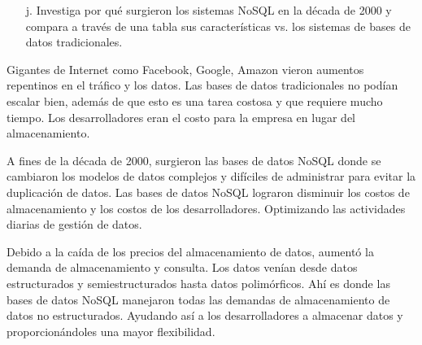 \documentclass{article}
\begin{document}
\begin{enumerate}
\begin{itemize}
    \item[j.]Investiga por qué surgieron los sistemas NoSQL en la década de 2000 y compara a través de una tabla sus características vs. los sistemas de bases de datos tradicionales.
    \end{itemize}
    Gigantes de Internet como Facebook, Google, Amazon vieron aumentos repentinos en el tráfico y los datos. Las bases de datos tradicionales no podían escalar bien, además de que esto es una tarea costosa y que requiere mucho tiempo. Los desarrolladores eran el costo para la empresa en lugar del almacenamiento. 
 
   A fines de la década de 2000, surgieron las bases de datos NoSQL donde se cambiaron los modelos de datos complejos y difíciles de administrar para evitar la duplicación de datos. 
   Las bases de datos NoSQL lograron disminuir los costos de almacenamiento y  los costos de los desarrolladores. Optimizando las actividades diarias de gestión de datos.

   Debido a la caída de los precios del almacenamiento de datos, aumentó la demanda de almacenamiento y consulta. Los datos venían desde datos estructurados y semiestructurados hasta datos polimórficos. Ahí es donde las bases de datos NoSQL manejaron todas las demandas de almacenamiento de datos no estructurados. Ayudando así a los desarrolladores a almacenar datos y proporcionándoles una mayor flexibilidad.
   

\end{enumerate}
\end{document}
